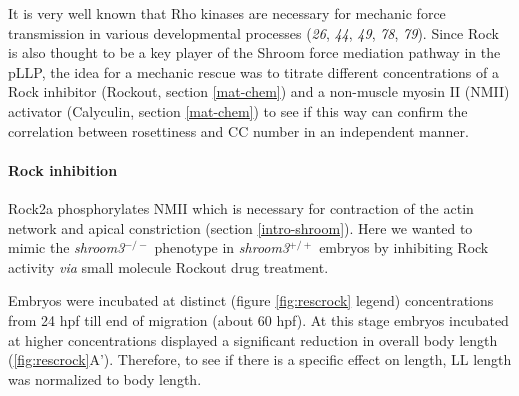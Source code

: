 \documentclass[10pt, b5paper, singlespacinge, twoside]{reedthesis} %
\theoremstyle{definition}
\theoremstyle{definition}
\theoremstyle{definition}
\theoremstyle{remark}
\begin{document}
It is very well known that Rho kinases are necessary for mechanic force transmission in various developmental processes (\emph{26}, \emph{44}, \emph{49}, \emph{78}, \emph{79}). Since Rock is also thought to be a key player of the Shroom force mediation pathway in the pLLP, the idea for a mechanic rescue was to titrate different concentrations of a Rock inhibitor (Rockout, section \ref{mat-chem}) and a non-muscle myosin II (NMII) activator (Calyculin, section \ref{mat-chem}) to see if this way can confirm the correlation between rosettiness and CC number in an independent manner.

\hypertarget{rock-inhibition}{%
\paragraph{Rock inhibition}\label{rock-inhibition}}

Rock2a phosphorylates NMII which is necessary for contraction of the actin network and apical constriction (section \ref{intro-shroom}). Here we wanted to mimic the \emph{shroom3}\(^{-/-}\) phenotype in \emph{shroom3}\(^{+/+}\) embryos by inhibiting Rock activity \emph{via} small molecule Rockout drug treatment.

Embryos were incubated at distinct (figure \ref{fig:rescrock} legend) concentrations from 24 hpf till end of migration (about 60 hpf). At this stage embryos incubated at higher concentrations displayed a significant reduction in overall body length (\ref{fig:rescrock}A'). Therefore, to see if there is a specific effect on length, LL length was normalized to body length.
\end{document}
